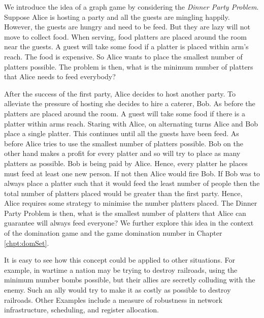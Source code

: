 We introduce the idea of a graph game by considering the \textit{Dinner Party Problem}.
Suppose Alice is hosting a party and all the guests are mingling happily. However, the guests are hungry and need to be feed. But they are lazy will not move to collect food. When serving, food platters are placed around the room near the guests. A guest will take some food if a platter is placed within arm's reach. The food is expensive. So Alice wants to place the smallest number of platters possible. The problem is then, what is the minimum number of platters that Alice needs to feed everybody? 


After the success of the first party, Alice decides to host another party. To alleviate the pressure of hosting she decides to hire a caterer, Bob. As before the platters are placed around the room. A guest will take some food if there is a platter within arms reach. Staring with Alice, on alternating turns Alice and Bob place a single platter. This continues until all the guests have been feed. As before Alice tries to use the smallest number of platters possible. Bob on the other hand makes a profit for every platter and so will try to place as many platters as possible. Bob is being paid by Alice. Hence, every platter he places must feed at least one new person. If not then Alice would fire Bob.
If Bob was to always place a platter such that it would feed the least number of people then the total number of platters placed would be greater than the first party. Hence, Alice requires some strategy to minimise the number platters placed. The Dinner Party Problem is then, what is the smallest number of platters that Alice can guarantee will always feed everyone? 
We further explore this idea in the context of the domination game and the game domination number in Chapter \ref{chpt:domSet}.

It is easy to see how this concept could be applied to other situations. For example, in wartime a nation may be trying to destroy railroads, using the minimum number bombs possible, but their allies are secretly colluding with the enemy. Such an ally would try to make it as costly as possible to destroy railroads. Other Examples include a measure of robustness in network infrastructure, scheduling, and register allocation.  

